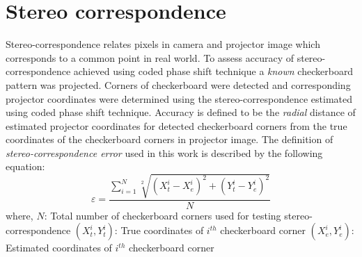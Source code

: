 \section{Stereo correspondence}
Stereo-correspondence relates pixels in camera and projector image which corresponds to a common point in real world. To assess accuracy of stereo-correspondence achieved using coded phase shift technique a \textit{known} checkerboard pattern was projected. Corners of checkerboard were detected and corresponding projector coordinates were determined using the stereo-correspondence estimated using coded phase shift technique. Accuracy is defined to be the \textit{radial} distance of estimated projector coordinates for detected checkerboard corners from the true coordinates of the checkerboard corners in projector image. The definition of \textit{stereo-correspondence error} used in this work is described by the following equation:
\begin{equation}
\varepsilon=\frac{\sum_{i=1}^N\sqrt[2]{(X_t^i-X_e^i)^2+(Y_t^i-Y_e^i)^2}}{N}
\end{equation}
\noindent
where,\newline
$N$: Total number of checkerboard corners used for testing stereo-correspondence \newline
$(X_t^i,Y_t^i)$: True coordinates of $i^{th}$ checkerboard corner\newline
$(X_e^i,Y_e^i)$: Estimated coordinates of $i^{th}$ checkerboard corner

